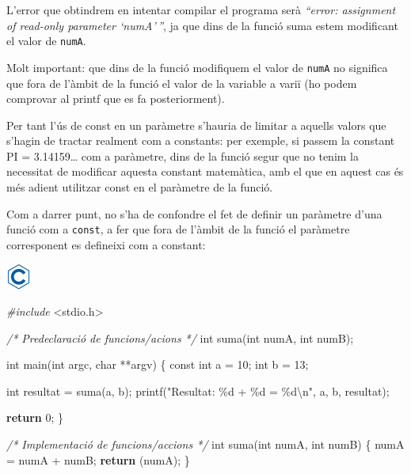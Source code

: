 \documentclass[]{book}
\newenvironment{Shaded}{\begin{snugshade}}{\end{snugshade}}
\newcommand{\CommentTok}[1]{\textcolor[rgb]{0.56,0.35,0.01}{\textit{#1}}}
\newcommand{\ControlFlowTok}[1]{\textcolor[rgb]{0.13,0.29,0.53}{\textbf{#1}}}
\newcommand{\DataTypeTok}[1]{\textcolor[rgb]{0.13,0.29,0.53}{#1}}
\newcommand{\DecValTok}[1]{\textcolor[rgb]{0.00,0.00,0.81}{#1}}
\newcommand{\ImportTok}[1]{#1}
\newcommand{\NormalTok}[1]{#1}
\newcommand{\PreprocessorTok}[1]{\textcolor[rgb]{0.56,0.35,0.01}{\textit{#1}}}
\newcommand{\SpecialCharTok}[1]{\textcolor[rgb]{0.00,0.00,0.00}{#1}}
\newcommand{\StringTok}[1]{\textcolor[rgb]{0.31,0.60,0.02}{#1}}
\begin{document}
L'error que obtindrem en intentar compilar el programa serà \emph{``error: assignment of read-only parameter `numA'\,''}, ja que dins de la funció suma estem modificant el valor de \texttt{numA}.

Molt important: que dins de la funció modifiquem el valor de \texttt{numA} no significa que fora de l'àmbit de la funció el valor de la variable a variï (ho podem comprovar al printf que es fa posteriorment).

Per tant l'ús de const en un paràmetre s'hauria de limitar a aquells valors que s'hagin de tractar realment com a constants: per exemple, si passem la constant PI = 3.14159\ldots{} com a paràmetre, dins de la funció segur que no tenim la necessitat de modificar aquesta constant matemàtica, amb el que en aquest cas és més adient utilitzar const en el paràmetre de la funció.

Com a darrer punt, no s'ha de confondre el fet de definir un paràmetre d'una funció com a \texttt{const}, a fer que fora de l'àmbit de la funció el paràmetre corresponent es defineixi com a constant:

\includegraphics{./img/c.png}

\begin{Shaded}
\begin{Highlighting}[]
\PreprocessorTok{\#include }\ImportTok{\textless{}stdio.h\textgreater{}}

\CommentTok{/* Predeclaració de funcions/acions */}
\DataTypeTok{int}\NormalTok{ suma(}\DataTypeTok{int}\NormalTok{ numA, }\DataTypeTok{int}\NormalTok{ numB);}

\DataTypeTok{int}\NormalTok{ main(}\DataTypeTok{int}\NormalTok{ argc, }\DataTypeTok{char}\NormalTok{ **argv) \{}
    \DataTypeTok{const} \DataTypeTok{int}\NormalTok{ a = }\DecValTok{10}\NormalTok{;}
    \DataTypeTok{int}\NormalTok{ b = }\DecValTok{13}\NormalTok{;}

    \DataTypeTok{int}\NormalTok{ resultat = suma(a, b);}
\NormalTok{    printf(}\StringTok{"Resultat: \%d + \%d = \%d}\SpecialCharTok{\textbackslash{}n}\StringTok{"}\NormalTok{, a, b, resultat);}

    \ControlFlowTok{return} \DecValTok{0}\NormalTok{;}
\NormalTok{\}}

\CommentTok{/* Implementació de funcions/accions */}
\DataTypeTok{int}\NormalTok{ suma(}\DataTypeTok{int}\NormalTok{ numA, }\DataTypeTok{int}\NormalTok{ numB) \{}
\NormalTok{    numA = numA + numB;}
    \ControlFlowTok{return}\NormalTok{ (numA);}
\NormalTok{\}}
\end{Highlighting}
\end{Shaded}
\end{document}

